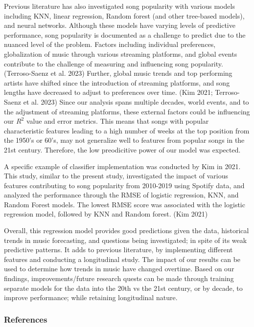 \documentclass[
]{article}
\begin{document}
Previous literature has also investigated song popularity with various
models including KNN, linear regression, Random forest (and other
tree-based models), and neural networks. Although these models have
varying levels of predictive performance, song popularity is documented
as a challenge to predict due to the nuanced level of the problem.
Factors including individual preferences, globalization of music through
various streaming platforms, and global events contribute to the
challenge of measuring and influencing song popularity. (Terroso-Saenz
et al. 2023) Further, global music trends and top performing artists
have shifted since the introduction of streaming platforms, and song
lengths have decreased to adjust to preferences over time. (Kim 2021;
Terroso-Saenz et al. 2023) Since our analysis spans multiple decades,
world events, and to the adjustment of streaming platforms, these
external factors could be influencing our \(R^2\) value and error
metrics. This means that songs with popular characteristic features
leading to a high number of weeks at the top position from the 1950's or
60's, may not generalize well to features from popular songs in the 21st
century. Therefore, the low preodicitive power of our model was
expected.

A specific example of classifier implementation was conducted by Kim in
2021. This study, similar to the present study, investigated the impact
of various features contributing to song popularity from 2010-2019 using
Spotify data, and analyzed the performance through the RMSE of logistic
regression, KNN, and Random Forest models. The lowest RMSE score was
associated with the logistic regression model, followed by KNN and
Random forest. (Kim 2021)

Overall, this regression model provides good predictions given the data,
historical trends in music forecasting, and questions being
investigated; in spite of its weak predictive patterns. It adds to
previous literature, by implementing different features and conducting a
longitudinal study. The impact of our results can be used to determine
how trends in music have changed overtime. Based on our findings,
improvements/future research quests can be made through training
separate models for the data into the 20th vs the 21st century, or by
decade, to improve performance; while retaining longitudinal nature.

\subsubsection*{References}\label{references}
\end{document}
